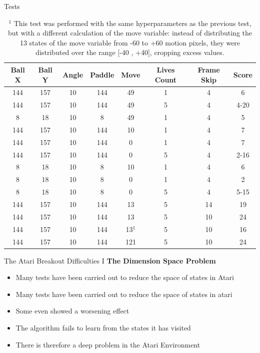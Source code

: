 \begin{frame}{Tests}
\begin{small}
	\begin{table}[h]
		\centering
		\begin{tabular}{*{8}{c}}
			Ball X & Ball Y & Angle & Paddle & Move & Lives Count & Frame Skip & Score \\
			\hline
			144 & 157 & 10 & 144 & 49 & 1 & 4 & 6 \\
			144 & 157 & 10 & 144 & 49 & 5 & 4 & 4-20 \\
			8 & 18 & 10 & 8 & 49 & 1 & 4 & 5 \\
			144 & 157 & 10 & 144 & 10 & 1 & 4 & 7 \\
			144 & 157 & 10 & 144 & 0 & 1 & 4 & 7 \\
			144 & 157 & 10 & 144 & 0 & 5 & 4 & 2-16 \\
			8 & 18 & 10 & 8 & 10 & 1 & 4 & 6 \\
			8 & 18 & 10 & 8 & 0 & 1 & 4 & 2 \\
			8 & 18 & 10 & 8 & 0 & 5 & 4 & 5-15 \\
			\hline
			144 & 157 & 10 & 144 & 13 & 5 & 14 & 19 \\
			144 & 157 & 10 & 144 & 13 & 5 & 10 & 24 \\
			144 & 157 & 10 & 144 & 13$^1$ & 5 & 10 & 16 \\
			144 & 157 & 10 & 144 & 121 & 5 & 10 & 24 \\
		\end{tabular}
		\caption{$^1$ This test was performed with the same hyperparameters as the previous test, but with a different calculation of the move variable: instead of distributing the 13 states of the move variable from -60 to +60 motion pixels, they were distributed over the range [-40 , +40], cropping excess values.}
	\end{table}
\end{small}
\end{frame}

\begin{frame}{The Atari Breakout Difficulties I}
\textbf{The Dimension Space Problem}
    \begin{itemize}
	\item Many tests have been carried out to reduce the space of states in Atari
	\item Many tests have been carried out to reduce the space of states in atari
	\item Some even showed a worsening effect
	\item The algorithm fails to learn from the states it has visited
	\item There is therefore a deep problem in the Atari Environment
    \end{itemize}
\end{frame}

